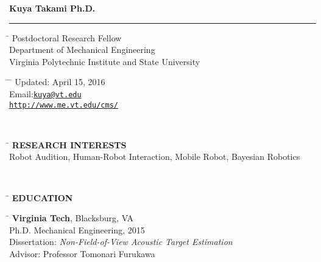 \documentclass[11pt,letter]{article}
\begin{document}
{\bf \huge \noindent Kuya Takami Ph.D.}\vspace{-2mm}\\
\rule{\textwidth}{1.7pt}

\parbox{0.4\textwidth}{ %
\begin{tabbing} %
		\hspace{0.5cm} \= \kill %
		 \> Postdoctoral Research Fellow\\ %
		\> Department of Mechanical Engineering \\
		 \>  Virginia Polytechnic Institute and State University
\end{tabbing}}
\hfill %
\parbox{0.4\textwidth}{ %
	\begin{tabbing} %
		\hspace{1cm} \= \hspace{4cm} \= \kill %
		\> Updated: April 15, 2016 \\ %
		\> Email:\href{mailto:kuya@vt.edu}{\tt kuya@vt.edu}  \\ %
		\> \href{http://www.me.vt.edu/cms/people/kuya-takami/}{\tt http://www.me.vt.edu/cms/}
	\end{tabbing}
}\\
\parbox{0.7\textwidth}{
\begin{tabbing}
	\hspace{1cm} \= \kill
	\>	{\bf \MakeUppercase{Research Interests}}\\
	\>	Robot Audition, Human-Robot Interaction, Mobile Robot, Bayesian Robotics
\end{tabbing}
}
\\
\vspace{-2mm}
\begin{tabbing}
	\hspace{1cm}\=\kill
	\>  {\bf \Large EDUCATION}
\end{tabbing} \vspace{-7mm}
\begin{tabbing}
	\hspace{3cm} \= \kill
	{\footnotesize } \> {\bf Virginia Tech}, Blacksburg, VA\\
	\> \quad  Ph.D.  Mechanical Engineering, 2015 \\
	\> \quad Dissertation: {\it Non-Field-of-View Acoustic Target Estimation}\\
	\> \quad Advisor: Professor Tomonari Furukawa
\end{tabbing}
\end{document}
